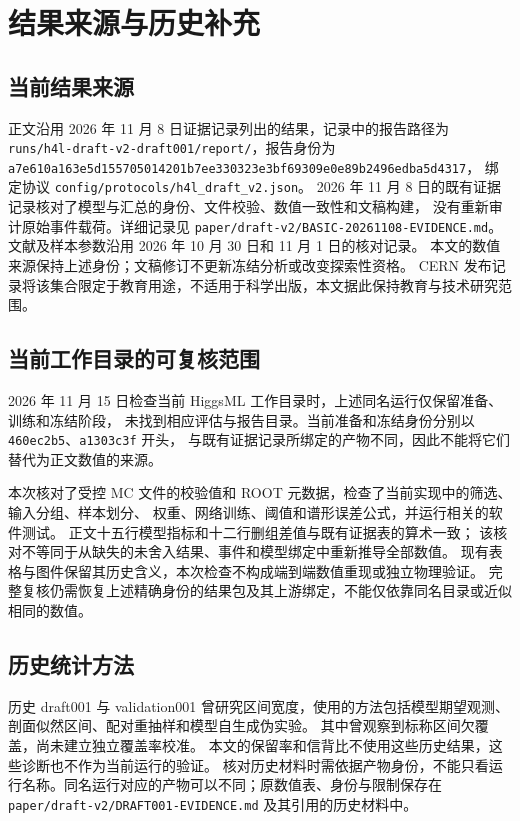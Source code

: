 \documentclass[11pt,a4paper,fontset=fandol,scheme=plain]{ctexart}
\begin{document}
\section{结果来源与历史补充}\label{app:provenance}

\subsection{当前结果来源}
正文沿用 2026 年 11 月 8 日证据记录列出的结果，记录中的报告路径为
\nolinkurl{runs/h4l-draft-v2-draft001/report/}，报告身份为
\nolinkurl{a7e610a163e5d155705014201b7ee330323e3bf69309e0e89b2496edba5d4317}，
绑定协议 \nolinkurl{config/protocols/h4l_draft_v2.json}。
2026 年 11 月 8 日的既有证据记录核对了模型与汇总的身份、文件校验、数值一致性和文稿构建，
没有重新审计原始事件载荷。详细记录见 \nolinkurl{paper/draft-v2/BASIC-20261108-EVIDENCE.md}。
文献及样本参数沿用 2026 年 10 月 30 日和 11 月 1 日的核对记录。
本文的数值来源保持上述身份；文稿修订不更新冻结分析或改变探索性资格。
CERN 发布记录将该集合限定于教育用途，不适用于科学出版，本文据此保持教育与技术研究范围。

\subsection{当前工作目录的可复核范围}\label{app:availability}
2026 年 11 月 15 日检查当前 HiggsML 工作目录时，上述同名运行仅保留准备、训练和冻结阶段，
未找到相应评估与报告目录。当前准备和冻结身份分别以 \texttt{460ec2b5}、\texttt{a1303c3f} 开头，
与既有证据记录所绑定的产物不同，因此不能将它们替代为正文数值的来源。

本次核对了受控 MC 文件的校验值和 ROOT 元数据，检查了当前实现中的筛选、输入分组、样本划分、
权重、网络训练、阈值和谱形误差公式，并运行相关的软件测试。
正文十五行模型指标和十二行删组差值与既有证据表的算术一致；
该核对不等同于从缺失的未舍入结果、事件和模型绑定中重新推导全部数值。
现有表格与图件保留其历史含义，本次检查不构成端到端数值重现或独立物理验证。
完整复核仍需恢复上述精确身份的结果包及其上游绑定，不能仅依靠同名目录或近似相同的数值。

\subsection{历史统计方法}\label{app:interval}
历史 draft001 与 validation001 曾研究区间宽度，使用的方法包括模型期望观测、剖面似然区间、配对重抽样和模型自生成伪实验。
其中曾观察到标称区间欠覆盖，尚未建立独立覆盖率校准。
本文的保留率和信背比不使用这些历史结果，这些诊断也不作为当前运行的验证。
核对历史材料时需依据产物身份，不能只看运行名称。同名运行对应的产物可以不同；原数值表、身份与限制保存在
\nolinkurl{paper/draft-v2/DRAFT001-EVIDENCE.md} 及其引用的历史材料中。
\end{document}
